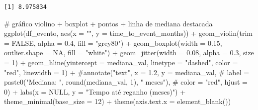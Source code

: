 \documentclass[
]{article}
\newenvironment{Shaded}{\begin{snugshade}}{\end{snugshade}}
\newcommand{\AttributeTok}[1]{\textcolor[rgb]{0.40,0.45,0.13}{#1}}
\newcommand{\CommentTok}[1]{\textcolor[rgb]{0.37,0.37,0.37}{#1}}
\newcommand{\ConstantTok}[1]{\textcolor[rgb]{0.56,0.35,0.01}{#1}}
\newcommand{\DecValTok}[1]{\textcolor[rgb]{0.68,0.00,0.00}{#1}}
\newcommand{\FloatTok}[1]{\textcolor[rgb]{0.68,0.00,0.00}{#1}}
\newcommand{\FunctionTok}[1]{\textcolor[rgb]{0.28,0.35,0.67}{#1}}
\newcommand{\NormalTok}[1]{\textcolor[rgb]{0.00,0.23,0.31}{#1}}
\newcommand{\SpecialCharTok}[1]{\textcolor[rgb]{0.37,0.37,0.37}{#1}}
\newcommand{\StringTok}[1]{\textcolor[rgb]{0.13,0.47,0.30}{#1}}
\begin{document}
\begin{verbatim}
[1] 8.975834
\end{verbatim}

\begin{Shaded}
\begin{Highlighting}[]
\CommentTok{\# gráfico violino + boxplot + pontos + linha de mediana destacada}
\FunctionTok{ggplot}\NormalTok{(df\_evento, }\FunctionTok{aes}\NormalTok{(}\AttributeTok{x =} \StringTok{""}\NormalTok{, }\AttributeTok{y =}\NormalTok{ time\_to\_event\_months)) }\SpecialCharTok{+}
  \FunctionTok{geom\_violin}\NormalTok{(}\AttributeTok{trim =} \ConstantTok{FALSE}\NormalTok{, }\AttributeTok{alpha =} \FloatTok{0.4}\NormalTok{, }\AttributeTok{fill =} \StringTok{"grey80"}\NormalTok{) }\SpecialCharTok{+}
  \FunctionTok{geom\_boxplot}\NormalTok{(}\AttributeTok{width =} \FloatTok{0.15}\NormalTok{, }\AttributeTok{outlier.shape =} \ConstantTok{NA}\NormalTok{, }\AttributeTok{fill =} \StringTok{"white"}\NormalTok{) }\SpecialCharTok{+}
  \FunctionTok{geom\_jitter}\NormalTok{(}\AttributeTok{width =} \FloatTok{0.08}\NormalTok{, }\AttributeTok{alpha =} \FloatTok{0.3}\NormalTok{, }\AttributeTok{size =} \DecValTok{1}\NormalTok{) }\SpecialCharTok{+}
  \FunctionTok{geom\_hline}\NormalTok{(}\AttributeTok{yintercept =}\NormalTok{ mediana\_val, }\AttributeTok{linetype =} \StringTok{"dashed"}\NormalTok{, }\AttributeTok{color =} \StringTok{"red"}\NormalTok{, }\AttributeTok{linewidth =} \DecValTok{1}\NormalTok{) }\SpecialCharTok{+}
  \CommentTok{\#annotate("text", x = 1.2, y = mediana\_val,}
  \CommentTok{\#         label = paste0("Mediana: ", round(mediana\_val, 1), " meses"),}
  \CommentTok{\#         color = "red", hjust = 0) +}
  \FunctionTok{labs}\NormalTok{(}\AttributeTok{x =} \ConstantTok{NULL}\NormalTok{, }\AttributeTok{y =} \StringTok{"Tempo até reganho (meses)"}\NormalTok{) }\SpecialCharTok{+}
  \FunctionTok{theme\_minimal}\NormalTok{(}\AttributeTok{base\_size =} \DecValTok{12}\NormalTok{) }\SpecialCharTok{+}
  \FunctionTok{theme}\NormalTok{(}\AttributeTok{axis.text.x =} \FunctionTok{element\_blank}\NormalTok{())}
\end{Highlighting}
\end{Shaded}
\end{document}
